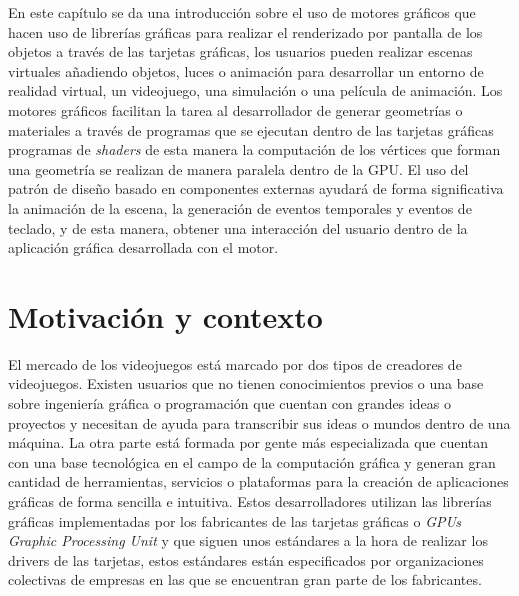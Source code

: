 \documentclass[a4paper]{book}
\begin{document}
En este capítulo se da una introducción sobre el uso de motores gráficos que hacen uso de librerías gráficas
para realizar el renderizado por pantalla de los objetos a través de las tarjetas gráficas, los usuarios
pueden realizar escenas virtuales añadiendo objetos, luces o animación para desarrollar un entorno
de realidad virtual, un videojuego, una simulación o una película de animación. Los motores gráficos facilitan
la tarea al desarrollador de generar geometrías o materiales a través de programas que se ejecutan dentro
de las tarjetas gráficas programas de \textit{shaders} de esta manera la computación de los vértices
que forman una geometría se realizan de manera paralela dentro de la GPU. El uso del patrón de diseño basado en
componentes externas ayudará de forma significativa la animación de la escena, la generación de eventos temporales
y eventos de teclado, y de esta manera, obtener una interacción del usuario dentro de la aplicación gráfica
desarrollada con el motor.

\section{Motivación y contexto}
\label{sec:}

El mercado de los videojuegos está marcado por dos tipos de creadores de videojuegos. Existen usuarios que no
tienen conocimientos previos o una base sobre ingeniería gráfica o programación que cuentan con grandes ideas o proyectos y
necesitan de ayuda para transcribir sus ideas o mundos dentro de una máquina. La otra parte está formada
por gente más especializada que cuentan con una base tecnológica en el campo de la computación gráfica y
generan gran cantidad de herramientas, servicios o plataformas para la creación de aplicaciones gráficas de
forma sencilla e intuitiva. Estos desarrolladores utilizan las librerías gráficas implementadas por los
fabricantes de las tarjetas gráficas o \textit{GPUs Graphic Processing Unit} y que siguen unos estándares
a la hora de realizar los drivers de las tarjetas, estos estándares están especificados por organizaciones 
colectivas de empresas en las que se encuentran gran parte de los fabricantes.

\end{document}
